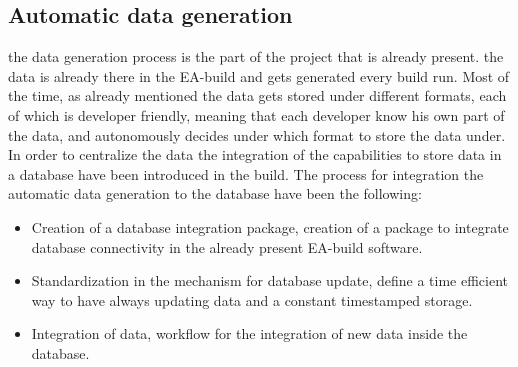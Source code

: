 \documentclass[../main.tex]{subfiles}
\begin{document}
\subsection{Automatic data generation}
the data generation process is the part of the project that is already present. the data is already there in the EA-build and gets generated every build run. Most of the time, as already mentioned the data gets stored under different formats, each of which is developer friendly, meaning that each developer know his own part of the data, and autonomously decides under which format to store the data under. 
In order to centralize the data the integration of the capabilities to store data in a database have been introduced in the build. The process for integration the automatic data generation to the database have been the following:
\begin{itemize}
    \item Creation of a database integration package, creation of a package to integrate database connectivity in the already present EA-build software.
    \item Standardization in the mechanism for database update, define a time efficient way to have always updating data and a constant timestamped storage. 
    \item Integration of data, workflow for the integration of new data inside the database.
\end{itemize}
\end{document}
